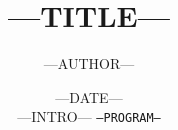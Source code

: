 \documentclass[fleqn,utf8,aspectratio=169,14pt]{beamer}
\title {---TITLE---}
\author{---AUTHOR---}
\date  {---DATE---\\[3mm] \scriptsize{---INTRO--- \texttt{---PROGRAM---}}}
\begin{document}
\frame{\titlepage}
\end{document}
